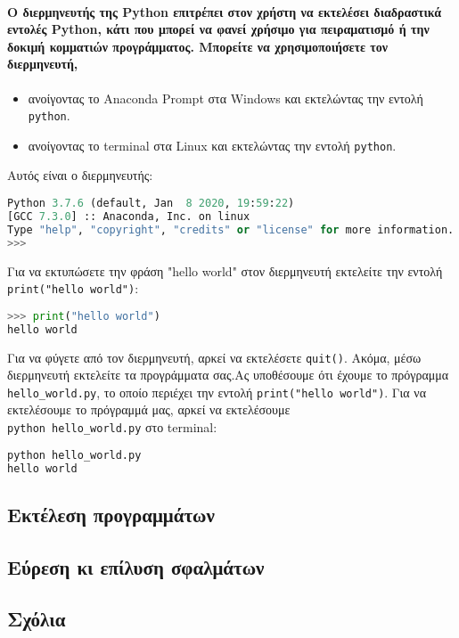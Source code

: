 \documentclass[a4paper,10pt]{report}
\begin{document}
\paragraph{
    Ο διερμηνευτής της Python επιτρέπει στον χρήστη να εκτελέσει διαδραστικά
    εντολές Python, κάτι που μπορεί να φανεί χρήσιμο για πειραματισμό ή
    την δοκιμή κομματιών προγράμματος. Μπορείτε να χρησιμοποιήσετε τον
    διερμηνευτή,
}
\begin{itemize}
    \item ανοίγοντας το Anaconda Prompt στα Windows και εκτελώντας την εντολή
          \lstinline{python}.
    \item ανοίγοντας το terminal στα Linux και εκτελώντας την εντολή
          \lstinline{python}.
\end{itemize}
Αυτός είναι ο διερμηνευτής:
\begin{lstlisting}[language=Python]
Python 3.7.6 (default, Jan  8 2020, 19:59:22)
[GCC 7.3.0] :: Anaconda, Inc. on linux
Type "help", "copyright", "credits" or "license" for more information.
>>>
\end{lstlisting}
Για να εκτυπώσετε την φράση "hello world" στον διερμηνευτή εκτελείτε  την
εντολή \\
\lstinline{print("hello world")}:
\begin{lstlisting}[language=Python]
>>> print("hello world")
hello world
\end{lstlisting}
Για να φύγετε από τον διερμηνευτή, αρκεί να εκτελέσετε
\lstinline{quit()}.
Ακόμα, μέσω διερμηνευτή εκτελείτε τα προγράμματα σας.Ας υποθέσουμε ότι
έχουμε το πρόγραμμα \lstinline{hello_world.py},
το οποίο περιέχει την εντολή \lstinline{print("hello world")}.
Για να εκτελέσουμε το πρόγραμμά μας, αρκεί να εκτελέσουμε \\
\lstinline{python hello_world.py}
στο terminal:
\begin{lstlisting}[language=Python]
python hello_world.py
hello world    
\end{lstlisting}
\subsection{Εκτέλεση προγραμμάτων}
\subsection{Εύρεση κι επίλυση σφαλμάτων}
\subsection{Σχόλια}
\end{document}
